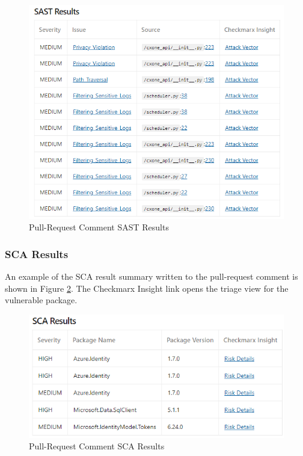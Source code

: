 \begin{figure}[ht]
    \includegraphics[width=\textwidth]{graphics/pr-sast.png}
    \caption{Pull-Request Comment SAST Results}
    \label{fig:pr-sast-section}
\end{figure}

\subsubsection{SCA Results}

An example of the SCA result summary written to the pull-request comment
is shown in Figure
\ref{fig:pr-sca-section}.  The Checkmarx Insight link opens the triage view 
for the vulnerable package. 

\begin{figure}[ht]
    \includegraphics[width=\textwidth]{graphics/pr-sca.png}
    \caption{Pull-Request Comment SCA Results}
    \label{fig:pr-sca-section}
\end{figure}

